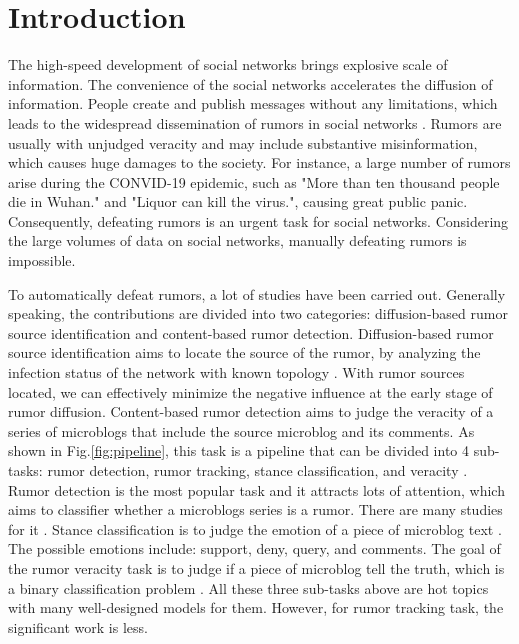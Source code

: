 \section{Introduction}
\label{sec:introduction}
The high-speed development of social networks brings explosive scale of information. The convenience of the social networks accelerates the diffusion of information. People create and publish messages without any limitations, which leads to the widespread dissemination of rumors in social networks \cite{DBLP:journals/corr/KurkaGZ15, DBLP:journals/csur/ZubiagaABLP18, DBLP:conf/sirocco/KostkaOW08, vosoughi2018spread}. Rumors are usually with unjudged veracity and may include substantive misinformation, which causes huge damages to the society. For instance, a large number of rumors arise during the CONVID-19 epidemic, such as "More than ten thousand people die in Wuhan." and "Liquor can kill the virus.", causing great public panic. Consequently, defeating rumors is an urgent task for social networks. Considering the large volumes of data on social networks, manually defeating rumors is impossible. 

To automatically defeat rumors, a lot of studies have been carried out. Generally speaking, the contributions are divided into two categories:  diffusion-based rumor source identification and content-based rumor detection. Diffusion-based rumor source identification aims to locate the source of the rumor, by analyzing the infection status of the network with known topology \cite{DBLP:conf/sigmetrics/ShahZ10, DBLP:journals/tit/ShahZ11, DBLP:conf/kdd/LappasTGM10}. With rumor sources located, we can effectively minimize the negative influence at the early stage of rumor diffusion. Content-based rumor detection aims to judge the veracity of a series of microblogs that include the source microblog and its comments. As shown in Fig.\ref{fig:pipeline}, this task is a pipeline that can be divided into 4 sub-tasks: rumor detection, rumor tracking, stance classification, and veracity \cite{DBLP:journals/csur/ZubiagaABLP18, DBLP:conf/coling/KochkinaLZ18}. Rumor detection is the most popular task and it attracts lots of attention, which aims to classifier whether a microblogs series is a rumor. There are many studies for it \cite{DBLP:conf/socinfo/ZubiagaLP17, DBLP:conf/www/Ma0W19,DBLP:conf/naacl/NguyenDCD19, DBLP:journals/corr/abs-1906-05659}. Stance classification is to judge the emotion of a piece of microblog text \cite{DBLP:conf/semeval/EnayetE17, DBLP:conf/semeval/X17a, DBLP:conf/coling/ZubiagaKLPL16}. The possible emotions include: support, deny, query, and comments. The goal of the rumor veracity task is to judge if a piece of microblog tell the truth, which is a binary classification problem \cite{DBLP:conf/coling/KochkinaLZ18, DBLP:conf/acl/LiZS19, DBLP:conf/acl/KumarC19}. All these three sub-tasks above are hot topics with many well-designed models for them. However, for rumor tracking task, the significant work is less.

